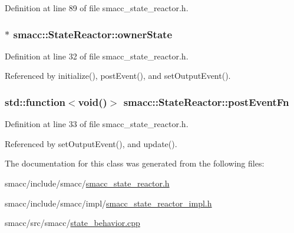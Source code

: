 Definition at line 89 of file smacc\+\_\+state\+\_\+reactor.\+h.

\subsubsection[{\texorpdfstring{owner\+State}{ownerState}}]{$\ast$ smacc\+::\+State\+Reactor\+::owner\+State}\hypertarget{classsmacc_1_1StateReactor_aabd30af9412a8fea9ec5906f173d9d4a}{}\label{classsmacc_1_1StateReactor_aabd30af9412a8fea9ec5906f173d9d4a}


Definition at line 32 of file smacc\+\_\+state\+\_\+reactor.\+h.



Referenced by initialize(), post\+Event(), and set\+Output\+Event().

\subsubsection[{\texorpdfstring{post\+Event\+Fn}{postEventFn}}]{\setlength{\rightskip}{0pt plus 5cm}std\+::function$<$void()$>$ smacc\+::\+State\+Reactor\+::post\+Event\+Fn}\hypertarget{classsmacc_1_1StateReactor_a1d97ae5c1689b6716c60c19c94a7eeae}{}\label{classsmacc_1_1StateReactor_a1d97ae5c1689b6716c60c19c94a7eeae}


Definition at line 33 of file smacc\+\_\+state\+\_\+reactor.\+h.



Referenced by set\+Output\+Event(), and update().



The documentation for this class was generated from the following files\+:\begin{DoxyCompactItemize}
\item 
smacc/include/smacc/\hyperlink{smacc__state__reactor_8h}{smacc\+\_\+state\+\_\+reactor.\+h}\item 
smacc/include/smacc/impl/\hyperlink{smacc__state__reactor__impl_8h}{smacc\+\_\+state\+\_\+reactor\+\_\+impl.\+h}\item 
smacc/src/smacc/\hyperlink{state__behavior_8cpp}{state\+\_\+behavior.\+cpp}\end{DoxyCompactItemize}
